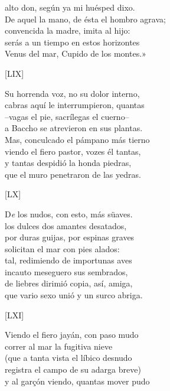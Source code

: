 \documentclass[11pt,a4paper,twoside]{article}
\begin{document}
alto don, según ya mi huésped dixo.\\
De aquel la mano, de ésta el hombro agrava;\\
convencida la madre, imita al hijo:\\
serás a un tiempo en estos horizontes\\
Venus del mar, Cupido de los montes.»\par\pend
%
\begin{center}
	[LIX]
\end{center}\pstart
Su horrenda voz, no su dolor interno,\\
cabras aquí le interrumpieron, quantas\\
--vagas el pie, sacrílegas el cuerno--\\
a Baccho se atrevieron en sus plantas.\\
Mas, conculcado el pámpano más tierno\\
viendo el fiero pastor, vozes él tantas,\\
y tantas despidió la honda piedras,\\
que el muro penetraron de las yedras.\par\pend
\relax
\vfill
\newpage
%
\begin{center}
	[LX]
\end{center}\pstart
D\textit{e} los nudos, con esto, más süaves.\\
los dulces dos amantes desatados,\\
por duras guijas, por espinas graves\\
solicitan el mar con pies alados:\\
tal, redimiendo de importunas aves\\
incauto meseguero sus sembrados,\\
de liebres dirimió copia, así, amiga,\\
que vario sexo unió y un surco abriga.\par\pend
%
\begin{center}
	[LXI]
\end{center}\pstart
Viendo el fiero jayán, con paso mudo\\
correr al mar la fugitiva nieve\\
(que a tanta vista el líbico desnudo\\
registra el campo de su adarga breve)\\
y al garçón viendo, quantas mover pudo\\
\end{document}
